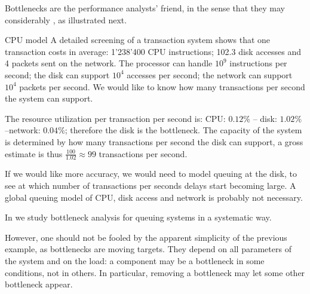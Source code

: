 Bottlenecks are the performance analysts' friend,
in the sense that they may considerably
, as
illustrated next.
\begin{ex}{CPU model}
A detailed screening of a transaction system
shows that one transaction costs in average:
1'238'400 CPU instructions; 102.3 disk accesses
and 4 packets sent on the network. The processor
can handle $10^9$ instructions per second; the
disk can support $10^4$ accesses per second; the
network can support $10^4$ packets per second. We
would like to know how many transactions per
second the system can support.
%

The resource utilization per transaction per second
is: CPU:
$0.12\%$ -- disk: $1.02\%$ --network: $0.04\%$;
therefore the disk is the bottleneck. The
capacity of the system is determined by how many
transactions per second the disk can support, a
gross estimate is thus $\frac{100}{1.02}\approx
99$ transactions per second.

If we would like more accuracy, we would need to
model queuing at the disk, to see at which number
of transactions per seconds delays start becoming
large. A global queuing model of CPU, disk access
and network is probably not necessary.

In  we study bottleneck analysis
for queuing systems in a systematic way.
\end{ex}

However, one should not be fooled by the apparent
simplicity of the previous example, as
bottlenecks are moving targets. They depend on
all parameters of the system and on the load: a
component may be a bottleneck in some conditions,
not in others. In particular, removing a
bottleneck may let some other bottleneck appear.

